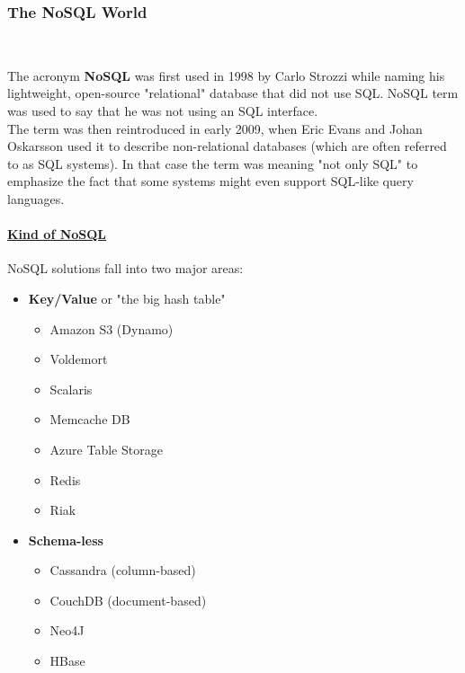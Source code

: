 \documentclass[10pt,a4paper]{article}
\begin{document}
\subsubsection{The NoSQL World}
\\ \raggedright \vspace{0.5em}
The acronym \textbf{NoSQL} was first used in 1998 by Carlo Strozzi while naming his lightweight, open-source "relational" database that did not use SQL. NoSQL term was used to say that he was not using an SQL interface. \\ 
The term was then reintroduced in early 2009, when Eric Evans and Johan Oskarsson used it to describe non-relational databases (which are often referred to as SQL systems). In that case the term was meaning "not only SQL" to emphasize the fact that some systems might even support SQL-like query languages.
\paragraph{\uline{Kind of NoSQL}}
NoSQL solutions fall into two major areas:
\begin{itemize}
	\item \textbf{Key/Value} or "the big hash table"
	\begin{itemize}
		\item Amazon S3 (Dynamo)
		\item Voldemort
		\item Scalaris
		\item Memcache DB
		\item Azure Table Storage
		\item Redis
		\item Riak
	\end{itemize}
	\item \textbf{Schema-less}
	\begin{itemize}
		\item Cassandra (column-based)
		\item CouchDB (document-based)
		\item Neo4J
		\item HBase
	\end{itemize}
\end{itemize}
\end{document}
